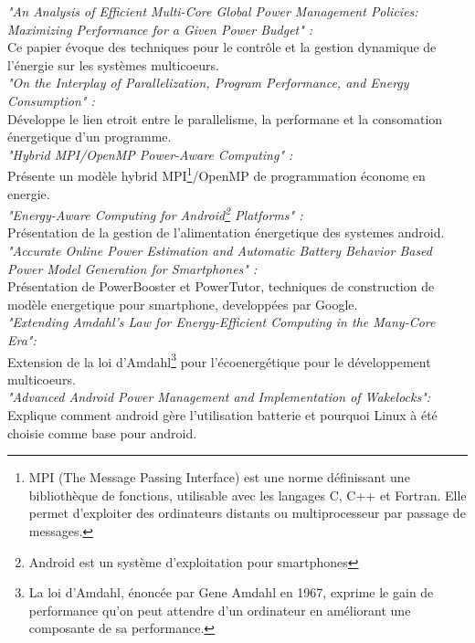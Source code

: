 	\textit {"An Analysis of Efficient Multi-Core Global Power Management Policies: Maximizing Performance for a Given Power Budget" :}\cite{ref9} \\
		Ce papier évoque des techniques pour le contrôle et la gestion dynamique de l'énergie sur les systèmes multicoeurs.\\

	\textit {"On the Interplay of Parallelization, Program Performance, and Energy Consumption" :}\cite{ref10}\\
		Développe le lien etroit entre le parallelisme, la performane et la consomation énergetique d'un programme.\\

	\textit {"Hybrid MPI/OpenMP Power-Aware Computing" :}\cite{ref8}\\
		Présente un modèle hybrid MPI\footnote{MPI (The Message Passing Interface) est une norme définissant une bibliothèque de fonctions, utilisable avec les langages C, C++ et Fortran. Elle permet d'exploiter des ordinateurs distants ou multiprocesseur par passage de messages.}/OpenMP de programmation économe en energie.\\

	\textit {"Energy-Aware Computing for Android\footnote{Android est un système d'exploitation pour smartphones} Platforms" :}\cite{ref11}\\
		Présentation de la gestion de l'alimentation énergetique des systemes android.\\ 

	\textit {"Accurate Online Power Estimation and Automatic Battery Behavior Based Power Model Generation for Smartphones" : }\cite{ref7}\\
		Présentation de PowerBooster et PowerTutor, techniques de construction de modèle energetique pour smartphone, developpées par Google.\\

	\textit {"Extending Amdahl’s Law for Energy-Efficient Computing in the Many-Core Era":}\cite{ref6}\\
		Extension de la loi d'Amdahl\footnote{La loi d'Amdahl, énoncée par Gene Amdahl en 1967, exprime le gain de performance qu'on peut attendre d'un ordinateur en améliorant une composante de sa performance.} pour l'écoenergétique pour le développement multicoeurs.\\

	\textit {"Advanced Android Power Management and Implementation of Wakelocks":}\cite{ref5}\\
		Explique comment android gère l'utilisation batterie et pourquoi Linux à été choisie comme base pour android.\\

